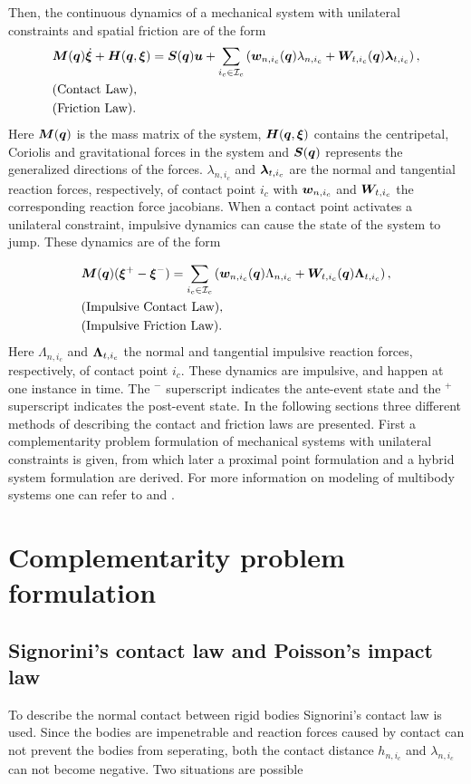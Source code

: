 \documentclass[../DC2017114Bouma.tex]{subfiles}
\begin{document}
Then, the continuous dynamics of a mechanical system with unilateral constraints and spatial friction are of the form
\begin{align}
&{\boldsymbol{M}}({\boldsymbol{q}})\dot{\boldsymbol{\xi}} + {\boldsymbol{H}}({\boldsymbol{q}},\boldsymbol{\xi}) = {\boldsymbol{S}}({\boldsymbol{q}}){\boldsymbol{u}} + \sum_{i_c\in\mathcal{I}_c}\left({\boldsymbol{w}}_{n,i_c}({\boldsymbol{q}})\lambda_{n,i_c} + {\boldsymbol{W}}_{t,i_c}({\boldsymbol{q}})\boldsymbol{\lambda}_{t,i_c} \right), \label{eq:appcont1}\\
&\text{(Contact Law)},\label{eq:appcont2}\\
&\text{(Friction Law)}.\label{eq:appcont3}
\end{align}
Here ${\boldsymbol{M}}({\boldsymbol{q}})$ is the mass matrix of the system, ${\boldsymbol{H}}({\boldsymbol{q}},\boldsymbol{\xi})$ contains the centripetal, Coriolis and gravitational forces in the system and ${\boldsymbol{S}}({\boldsymbol{q}})$ represents the generalized directions of the forces. $\lambda_{n,i_c}$ and $\boldsymbol{\lambda}_{t,i_c}$ are the normal and tangential reaction forces, respectively, of contact point $i_c$ with ${\boldsymbol{w}}_{n,i_c}$ and ${\boldsymbol{W}}_{t,i_c}$ the corresponding reaction force jacobians. When a contact point activates a unilateral constraint, impulsive dynamics can cause the state of the system to jump. These dynamics are of the form

\begin{align}
&{\boldsymbol{M}}({\boldsymbol{q}})(\boldsymbol{\xi}^+ - \boldsymbol{\xi}^-) = \sum_{i_c\in\mathcal{I}_c}\left( {\boldsymbol{w}}_{n,i_c}({\boldsymbol{q}})\Lambda_{n,i_c} + {\boldsymbol{W}}_{t,i_c}({\boldsymbol{q}})\boldsymbol{\Lambda}_{t,i_c}\right), \label{eq:appimp1}\\
&\text{(Impulsive Contact Law)},\label{eq:appimp2}\\
&\text{(Impulsive Friction Law)}.\label{eq:appimp3}
\end{align}
Here $\Lambda_{n,i_c}$ and $\boldsymbol{\Lambda}_{t,i_c}$ the normal and tangential impulsive reaction forces, respectively, of contact point $i_c$. These dynamics are impulsive, and happen at one instance in time. The $^-$ superscript indicates the ante-event state and the $^+$ superscript indicates the post-event state. In the following sections three different methods of describing the contact and friction laws are presented. First a complementarity problem formulation of mechanical systems with unilateral constraints is given, from which later a proximal point formulation and a hybrid system formulation are derived. For more information on modeling of multibody systems one can refer to \cite{Leine2008} and \cite{Wouw2016}.

\section{Complementarity problem formulation}\label{sec:comp}
\subsection{Signorini's contact law and Poisson's impact law}
To describe the normal contact between rigid bodies Signorini's contact law is used. Since the bodies are impenetrable and reaction forces caused by contact can not prevent the bodies from seperating, both the contact distance $h_{n,i_c}$ and $\lambda_{n,i_c}$ can not become negative. Two situations are possible
\end{document}
